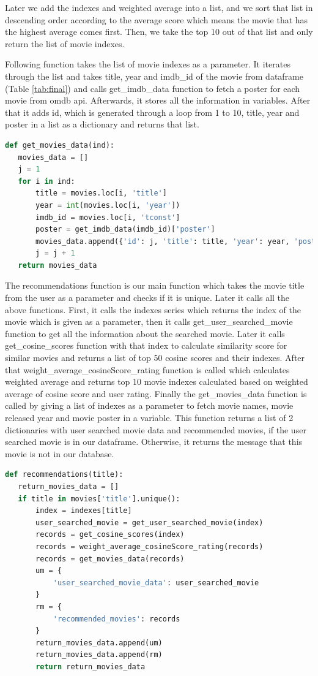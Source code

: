 Later we add the indexes and weighted average into a list, and we sort that list in descending order according to the average score which means the movie that has the highest average comes first. Then, we take the top 10 out of that list and only return the list of movie indexes.

Following function takes the list of movie indexes as a parameter. It iterates through the list and takes title, year and imdb\_id of the movie from dataframe (Table \ref{tab:final}) and calls get\_imdb\_data function to fetch a poster for each movie from omdb api. Afterwards, it stores all the information in variables. After that it adds  id, which is generated through a loop from 1 to 10, title, year and poster in a list as a dictionary and returns that list.

\begin{lstlisting}[language=python]
def get_movies_data(ind):
   movies_data = []
   j = 1
   for i in ind:
       title = movies.loc[i, 'title']
       year = int(movies.loc[i, 'year'])
       imdb_id = movies.loc[i, 'tconst']
       poster = get_imdb_data(imdb_id)['poster']
       movies_data.append({'id': j, 'title': title, 'year': year, 'poster': poster})
       j = j + 1
   return movies_data
\end{lstlisting}

The recommendations function is our main function which takes the movie title from the user as a parameter and checks if it is unique. Later it calls all the above functions. First, it calls the indexes series which returns the index of the movie which is given as a parameter, then it calls get\_user\_searched\_movie function to get all the information about the searched movie. Later it calls get\_cosine\_scores function with that index to calculate similarity score for similar movies and returns a list of top 50 cosine scores and their indexes. After that weight\_average\_cosineScore\_rating function is called which calculates weighted average and returns top 10 movie indexes calculated based on weighted average of cosine score and user rating. Finally the get\_movies\_data function is called by giving a list of indexes as a parameter to fetch movie names, movie released year and movie poster in a variable. This function returns a list of 2 dictionaries with user searched movie data and recommended movies, if the user searched movie is in our dataframe. Otherwise, it returns the message that this movie is not in our database.

\begin{lstlisting}[language=python]
def recommendations(title):
   return_movies_data = []
   if title in movies['title'].unique():
       index = indexes[title]
       user_searched_movie = get_user_searched_movie(index)
       records = get_cosine_scores(index)
       records = weight_average_cosineScore_rating(records)
       records = get_movies_data(records)
       um = {
           'user_searched_movie_data': user_searched_movie
       }
       rm = {
           'recommended_movies': records
       }
       return_movies_data.append(um)
       return_movies_data.append(rm)
       return return_movies_data
\end{lstlisting}

